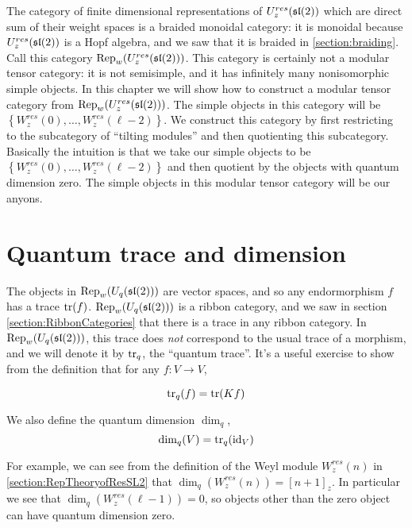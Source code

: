 The category of finite dimensional representations of $U_z^{res}(\mathfrak{sl}(2))$
which are direct sum of their weight spaces is a braided monoidal category: it
is monoidal because $U_z^{res}(\mathfrak{sl}(2))$ is a Hopf algebra, and we saw that it
is braided in \ref{section:braiding}. Call this category
$\operatorname{Rep}_w(U_z^{res}(\mathfrak{sl}(2)))$. This category is certainly not a modular tensor
category: it is not semisimple, and it has infinitely many nonisomorphic simple
objects. In this chapter we will show how to construct a modular tensor
category from $\operatorname{Rep}_w(U_z^{res}(\mathfrak{sl}(2)))$. The simple objects in this category
will be $\left\{ W_z^{res}(0), \ldots, W_z^{res}(\ell-2) \right\}$. We
construct this category by first restricting to the subcategory of ``tilting
modules'' and then quotienting this subcategory. Basically the intuition is
that we take our simple objects to be $\left\{ W_z^{res}(0), \ldots,
W_z^{res}(\ell-2) \right\}$ and then quotient by the objects with quantum
dimension zero.  The simple objects in this modular tensor category will
be our anyons.



\section{Quantum trace and dimension}

The objects in $\operatorname{Rep}_w(U_q(\mathfrak{sl}(2)))$ are vector spaces, and so any
endormorphism $f$ has a trace $\operatorname{tr}(f)$. $\operatorname{Rep}_w(U_q(\mathfrak{sl}(2)))$ is a ribbon
category, and we saw in section \ref{section:RibbonCategories} that there is a
trace in any ribbon category. In $\operatorname{Rep}_w(U_q(\mathfrak{sl}(2)))$, this trace does
\emph{not} correspond to the usual trace of a morphism, and we will denote it
by $\operatorname{tr}_q$, the ``quantum trace''. It's a useful exercise to show from the
definition that for any $f: V \to V$,

\begin{equation}
\operatorname{tr}_q(f) = \operatorname{tr}(Kf)
\end{equation}

We also define the quantum dimension $\dim_q$,
\begin{equation}
\dim_q(V) = \operatorname{tr}_q(\operatorname{id}_V)
\end{equation}

For example, we can see from the definition of the Weyl module $W_z^{res}(n)$
in \ref{section:RepTheoryofResSL2} that $\dim_q(W_z^{res}(n)) = [n+1]_z$. In
particular we see that $\dim_q(W_z^{res}(\ell - 1)) = 0$, so objects other than
the zero object can have quantum dimension zero. 


